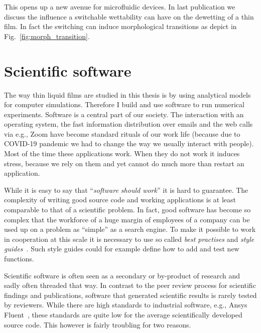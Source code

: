 This opens up a new avenue for microfluidic devices.
In last publication we discuss the influence a switchable wettability can have on the dewetting of a thin film.
In fact the switching can induce morphological transitions as depict in Fig.~\ref{fig:morph_transition}. 

\section{Scientific software}
\label{section:statement_software}
The way thin liquid films are studied in this thesis is by using analytical models for computer simulations.
Therefore I build and use software to run numerical experiments.
Software is a central part of our society.
The interaction with an operating system, the fast information distribution over emails and the web calls via e.g., Zoom have become standard rituals of our work life (because due to COVID-19 pandemic we had to change the way we usually interact with people).
Most of the time these applications work.
When they do not work it induces stress, because we rely on them and yet cannot do much more than restart an application.

While it is easy to say that ``\textit{software should work}'' it is hard to guarantee.
The complexity of writing good source code and working applications is at least comparable to that of a scientific problem.
In fact, good software has become so complex that the workforce of a huge margin of employees of a company can be used up on a problem as ``simple'' as a search engine.
To make it possible to work in cooperation at this scale it is necessary to use so called \textit{best practises} and \textit{style guides}~\cite{sommervilleSoftwareEngineering2015}.
Such style guides could for example define how to add and test new functions.

Scientific software is often seen as a secondary or by-product of research and sadly often threaded that way.
In contrast to the peer review process for scientific findings and publications, software that generated scientific results is rarely tested by reviewers.  
While there are high standards to industrial software, e.g., Ansys Fluent~\cite{matssonIntroductionANSYSFluent2022}, these standards are quite low for the average scientifically developed source code.
This however is fairly troubling for two reasons.

